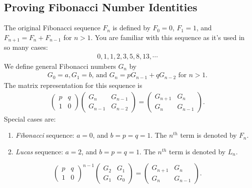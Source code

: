 \documentclass{subfile}
\begin{document}
\subsection{Proving Fibonacci Number Identities}
The original Fibonacci sequence $F_n$ is defined by $F_0=0$, $F_1=1$, and $F_{n+1} = F_{n}+F_{n-1}$ for $n>1$. You are familiar with this sequence as it's used in so many cases:
\begin{align*}
0,1,1,2,3,5,8,13,\cdots
\end{align*}
We define general Fibonacci numbers $G_n$ by
\begin{align*}
G_0=a,G_1=b\text{, and } G_n=pG_{n-1}+qG_{n-2} \text{ for } n>1.
\end{align*}
The matrix representation for this sequence is
\begin{align*}
\begin{pmatrix}
p & q\\
1 & 0
\end{pmatrix}
\begin{pmatrix}
G_n & G_{n-1}\\
G_{n-1} & G_{n-2}
\end{pmatrix}=
\begin{pmatrix}
G_{n+1} & G_n\\
G_n & G_{n-1}
\end{pmatrix}.
\end{align*}
Special cases are:
\begin{enumerate}
\item \textit{Fibonacci} sequence: $a=0$, and $b=p=q=1$. The $n^{th}$ term is denoted by $F_n$.
\item \textit{Lucas} sequence: $a=2$, and $b=p=q=1$. The $n^{th}$ term is denoted by $L_n$.
\end{enumerate}

\begin{theorem}
\begin{equation}
\begin{pmatrix}
p & q\\
1 & 0
\end{pmatrix}^{n-1}
\begin{pmatrix}
G_2 & G_1\\
G_1 & G_0
\end{pmatrix}=
\begin{pmatrix}
G_{n+1} & G_n\\
G_n & G_{n-1}
\end{pmatrix}.\label{eqn:generalfibo}
\end{equation}
\end{theorem}
\end{document}
